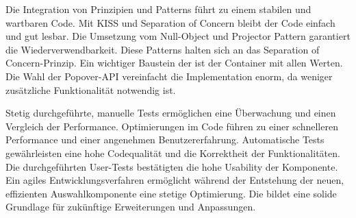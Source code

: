 Die Integration von Prinzipien und Patterns führt zu einem stabilen und wartbaren Code. 
Mit KISS und Separation of Concern bleibt der Code einfach und gut lesbar. 
Die Umsetzung vom Null-Object und Projector Pattern garantiert die Wiederverwendbarkeit. 
Diese Patterns halten sich an das Separation of Concern-Prinzip. 
Ein wichtiger Baustein der  ist der Container mit allen Werten. 
Die Wahl der Popover-API vereinfacht die Implementation enorm, da weniger zusätzliche Funktionalität notwendig ist. 

Stetig durchgeführte, manuelle Tests ermöglichen eine Überwachung und einen Vergleich der Performance. 
Optimierungen im Code führen zu einer schnelleren Performance und einer angenehmen Benutzererfahrung. 
Automatische Tests gewährleisten eine hohe Codequalität und die Korrektheit der Funktionalitäten. 
Die durchgeführten User-Tests bestätigten die hohe Usability der Komponente. 
Ein agiles Entwicklungsverfahren ermöglicht während der Entstehung der neuen, effizienten Auswahlkomponente eine stetige Optimierung. 
Die  bildet eine solide Grundlage für zukünftige Erweiterungen und Anpassungen. 
